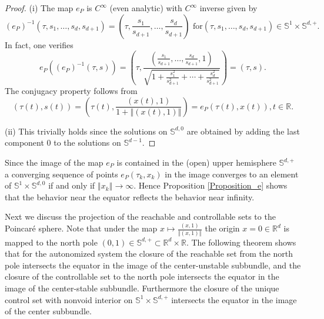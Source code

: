 \documentclass{siamltex}%
\begin{document}
\begin{proof}
(i) The map $e_{P}$ is $C^{\infty}$ (even analytic) with $C^{\infty}$ inverse
given by%
\[
\left(  e_{P}\right)  ^{-1}(\tau,s_{1},\ldots,s_{d},s_{d+1})=\left(
\tau,\frac{s_{1}}{s_{d+1}},\ldots,\frac{s_{d}}{s_{d+1}}\right)  \text{ for
}(\tau,s_{1},\ldots,s_{d},s_{d+1})\in\mathbb{S}^{1}\times\mathbb{S}^{d,+}.
\]
In fact, one verifies%
\[
e_{P}(\left(  e_{P}\right)  ^{-1}(\tau,s))=\left(  \tau,\frac{\left(
\frac{s_{1}}{s_{d+1}},\ldots,\frac{s_{d}}{s_{d+1}},1\right)  }{\sqrt
{1+\frac{s_{1}^{2}}{s_{d+1}^{2}}+\cdots+\frac{s_{d}^{2}}{s_{d+1}^{2}}}%
}\right)  =(\tau,s).
\]
The conjugacy property follows from
\[
\left(  \tau(t),s(t)\right)  =\left(  \tau(t),\frac{(x(t),1)}{1+\left\Vert
(x(t),1)\right\Vert }\right)  =e_{P}(\tau(t),x(t)),t\in\mathbb{R}.
\]


(ii) This trivially holds since the solutions on $\mathbb{S}^{d,0}$ are
obtained by adding the last component $0$ to the solutions on $\mathbb{S}%
^{d-1}$.
\end{proof}

Since the image of the map $e_{P}$ is contained in the (open) upper hemisphere
$\mathbb{S}^{d,+}$ a converging sequence of points $e_{P}(\tau_{k},x_{k})$ in
the image converges to an element of $\mathbb{S}^{1}\times\mathbb{S}^{d,0}$ if
and only if $\left\Vert x_{k}\right\Vert \rightarrow\infty$. Hence Proposition
\ref{Proposition_e} shows that the behavior near the equator reflects the
behavior near infinity.

Next we discuss the projection of the reachable and controllable sets to the
Poincar\'{e} sphere. Note that under the map $x\mapsto\frac{(x,1)}{\left\Vert
(x,1)\right\Vert }$ the origin $x=0\in\mathbb{R}^{d}$ is mapped to the north
pole $(0,1)\in\mathbb{S}^{d,+}\subset\mathbb{R}^{d}\times\mathbb{R}$. The
following theorem shows that for the autonomized system the closure of the
reachable set from the north pole intersects the equator in the image of the
center-unstable subbundle, and the closure of the controllable set to the
north pole intersects the equator in the image of the center-stable subbundle.
Furthermore the closure of the unique control set with nonvoid interior on
$\mathbb{S}^{1}\times\mathbb{S}^{d,+}$ intersects the equator in the image of
the center subbundle.
\end{document}
